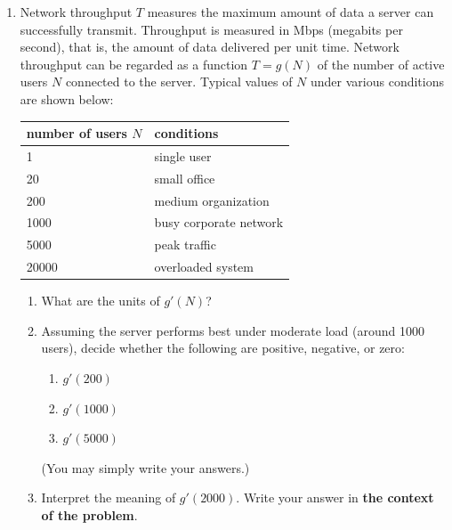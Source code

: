 \documentclass[11pt]{article}
\begin{document}
\begin{enumerate}
\item[\textbf{D1}.]
Network throughput $T$
measures the maximum amount of data a server can successfully transmit.
Throughput is measured in
Mbps (megabits per second),
that is, the amount of data delivered per unit time.
Network throughput can be regarded as a function
$T=g(N)$
of the number of active users 
$N$
connected to the server.
Typical values of 
$N$ under various conditions are shown below:
\begin{center}
\begin{tabular}{|l|l|}
\hline
\textbf{number of users $N$} & \textbf{conditions} \\
\hline
1 & single user \\
\hline
20 & small office \\
\hline
200 & medium organization \\
\hline
1000 & busy corporate network \\
\hline
5000 & peak traffic \\
\hline
20000 & overloaded system \\
\hline
\end{tabular}
\end{center}
\begin{enumerate}
\item[(a)]
What are the units of $g'(N)$?
\vfill
\item[(b)]
Assuming the server performs best under moderate load
(around 1000 users),
decide whether the following are positive, negative,
or zero:
\begin{enumerate}
    \item $g'(200)$
    \vspace{0.25in}
    \item $g'(1000)$
    \vspace{0.25in}
    \item $g'(5000)$
    \vspace{0.25in}
\end{enumerate}
(You may simply write your answers.)
\item[(c)]
Interpret the meaning of 
$g'(2000)$.
Write your answer in \textbf{the
context of the problem}.
\vfill
\end{enumerate}

\vfill
\end{enumerate}
\end{document}
